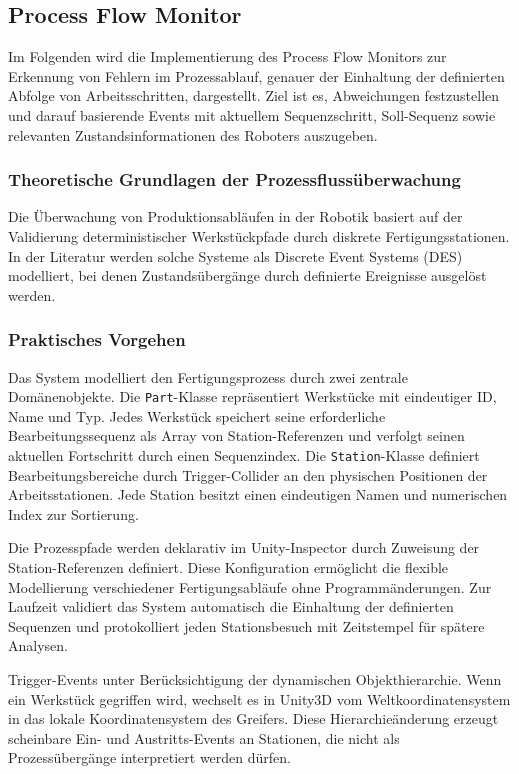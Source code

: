 \subsection{Process Flow Monitor}
\label{section:prozessfolgen}
Im Folgenden wird die Implementierung des Process Flow
Monitors zur Erkennung von Fehlern im Prozessablauf, genauer der
Einhaltung der definierten Abfolge von Arbeitsschritten, dargestellt.
Ziel ist es, Abweichungen festzustellen und darauf basierende Events mit
aktuellem Sequenzschritt, Soll-Sequenz sowie relevanten Zustandsinformationen
des Roboters auszugeben.

\subsubsection{Theoretische Grundlagen der Prozessflussüberwachung}
Die Überwachung von Produktionsabläufen in der Robotik basiert auf
der Validierung
deterministischer Werkstückpfade durch diskrete Fertigungsstationen. In der
Literatur werden solche Systeme als Discrete Event Systems (DES) modelliert, bei
denen Zustandsübergänge durch definierte Ereignisse ausgelöst
werden.

\subsubsection{Praktisches Vorgehen}
Das System modelliert den Fertigungsprozess durch zwei zentrale Domänenobjekte.
Die \texttt{Part}-Klasse repräsentiert Werkstücke mit eindeutiger ID, Name und
Typ. Jedes Werkstück speichert seine erforderliche Bearbeitungssequenz als
Array von Station-Referenzen und verfolgt seinen aktuellen Fortschritt durch
einen Sequenzindex. Die \texttt{Station}-Klasse definiert Bearbeitungsbereiche
durch Trigger-Collider an den physischen Positionen der Arbeitsstationen. Jede
Station besitzt einen eindeutigen Namen und numerischen Index zur Sortierung.

Die Prozesspfade werden deklarativ im Unity-Inspector durch Zuweisung der
Station-Referenzen definiert. Diese Konfiguration ermöglicht die flexible
Modellierung verschiedener Fertigungsabläufe ohne Programmänderungen. Zur
Laufzeit validiert das System automatisch die Einhaltung der definierten
Sequenzen und protokolliert jeden Stationsbesuch mit Zeitstempel für spätere
Analysen.

Trigger-Events unter Berücksichtigung der dynamischen Objekthierarchie. Wenn ein
Werkstück gegriffen wird, wechselt es in Unity3D vom
Weltkoordinatensystem in das
lokale Koordinatensystem des Greifers. Diese Hierarchieänderung erzeugt
scheinbare Ein- und Austritts-Events an Stationen, die nicht als
Prozessübergänge interpretiert werden dürfen.

